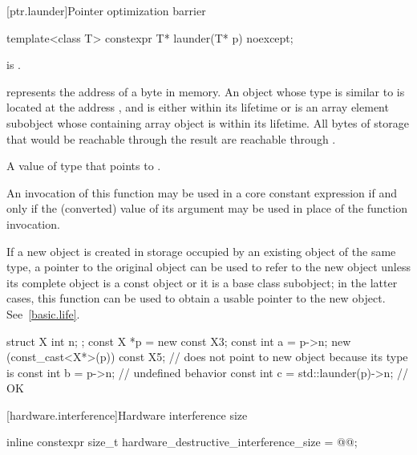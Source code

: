 [ptr.launder]{Pointer optimization barrier}

%
\begin{itemdecl}
template<class T> constexpr T* launder(T* p) noexcept;
\end{itemdecl}

\begin{itemdescr}
\pnum
\mandates
{} is .

\pnum
\expects
{} represents the address  of a byte in memory.
An object 
whose type is similar to 
is located at the address , and
is either within its lifetime or
is an array element subobject
whose containing array object is within its lifetime.
All bytes of storage that would be
reachable through the result
are reachable through .

\pnum
\returns
A value of type  that points to .

\pnum
\remarks
An invocation of this function
may be used in a core constant expression
if and only if the (converted) value of its argument
may be used in place of the function invocation.

\pnum
\begin{note}
If a new object is created
in storage occupied by an existing object of the same type,
a pointer to the original object
can be used to refer to the new object
unless its complete object is a const object or it is a base class subobject;
in the latter cases,
this function can be used to obtain a usable pointer to the new object.
See~\ref{basic.life}.
\end{note}

\pnum
\begin{example}
\begin{codeblock}
struct X { int n; };
const X *p = new const X{3};
const int a = p->n;
new (const_cast<X*>(p)) const X{5}; //  does not point to new object because its type is 
const int b = p->n;                 // undefined behavior
const int c = std::launder(p)->n;   // OK
\end{codeblock}
\end{example}
\end{itemdescr}

[hardware.interference]{Hardware interference size}

%
\begin{itemdecl}
inline constexpr size_t hardware_destructive_interference_size = @\impdef{}@;
\end{itemdecl}

